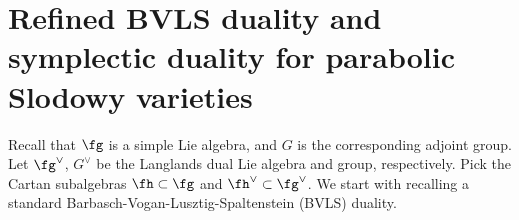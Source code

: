 \documentclass[12pt]{amsart}
\begin{document}

        
  \section{Refined BVLS duality and symplectic duality for parabolic Slodowy varieties}\label{sect_refined_BVLS}
    Recall that $\fg$ is a simple Lie algebra, and $G$ is the corresponding adjoint group. Let $\fg^\vee$, $G^\vee$ be the Langlands dual Lie algebra and group, respectively. Pick the Cartan subalgebras $\fh\subset \fg$ and $\fh^\vee\subset \fg^\vee$. We start with recalling a standard Barbasch-Vogan-Lusztig-Spaltenstein (BVLS) duality. 
\end{document}
